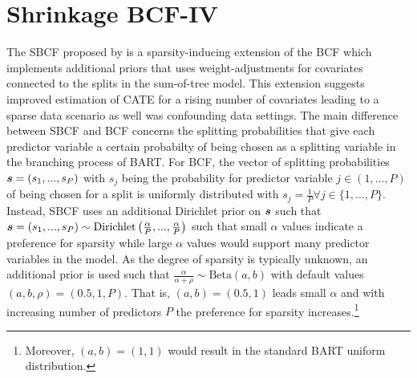 \section{Shrinkage BCF-IV}
\label{sec:SBCF-IV}

The SBCF proposed by \cite{caron_shrinkage_2022} is a sparsity-inducing extension of the BCF which implements additional priors that uses weight-adjustments for covariates connected to the splits in the sum-of-tree model. This extension suggests improved estimation of CATE for a rising number of covariates leading to a sparse data scenario as well was confounding data settings. 
The main difference between SBCF and BCF concerns the splitting probabilities that give each predictor variable a certain probabilty of being chosen as a splitting variable in the branching process of BART. 
For BCF, the vector of splitting probabilities $\bm s=\left(s_1, ..., s_P\right)$ with $s_j$ being the probability for predictor variable $j \in \left(1, ..., P \right)$ of being chosen for a split is uniformly distributed with $s_j=\frac{1}{P} \forall j \in \{1, ..., P \}$. Instead, SBCF uses an additional Dirichlet prior on $\bm s$ such that $\bm s =\left(s_1, ..., s_P \right) \sim \text{Dirichlet}\left( \frac{\alpha}{P}, ..., \frac{\alpha}{P} \right)$ such that small $\alpha$ values indicate a preference for sparsity while large $\alpha$ values would support many predictor variables in the model. As the degree of sparsity is typically unknown, an additional prior is used such that $\frac{\alpha}{\alpha+\rho} \sim {\text{Beta}\left(a, b\right)}$ with default values $\left(a, b, \rho \right) = \left(0.5, 1,P \right)$. That is, $(a, b) = (0.5, 1)$ leads small $\alpha$ and with increasing number of predictors $P$ the preference for sparsity increases.\footnote{Moreover, $(a, b) = (1, 1)$ would result in the standard BART uniform distribution.}






